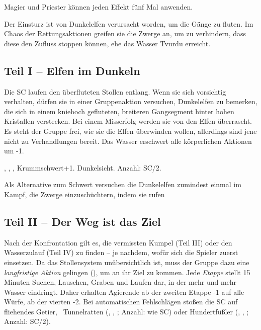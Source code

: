 {		

		\noindent
		Magier und Priester können jeden Effekt fünf Mal anwenden.


		\noindent
		Der Einsturz ist von Dunkelelfen verursacht worden, um die Gänge zu fluten. Im Chaos der Rettungsaktionen greifen sie die Zwerge an, um zu verhindern, dass diese den Zufluss stoppen können, ehe das Wasser Tvurdu erreicht.

		\subsection{Teil I -- Elfen im Dunkeln}

		\noindent
		Die SC laufen den überfluteten Stollen entlang. Wenn sie sich vorsichtig verhalten, dürfen sie in einer Gruppenaktion versuchen, Dunkelelfen zu bemerken, die sich in einem kniehoch gefluteten, breiteren Gangsegment hinter hohen Kristallen verstecken. Bei einem Misserfolg werden sie von den Elfen überrascht. Es steht der Gruppe frei, wie sie die Elfen überwinden wollen, allerdings sind jene nicht zu Verhandlungen bereit. Das Wasser erschwert alle körperlichen Aktionen um -1.

		 , , , Krummschwert+1. Dunkelsicht. Anzahl: SC/2.

		Als Alternative zum Schwert versuchen die Dunkelelfen zumindest einmal im Kampf, die Zwerge einzuschüchtern, indem sie rufen 

		\subsection{Teil II -- Der Weg ist das Ziel}

		Nach der Konfrontation gilt es, die vermissten Kumpel (Teil III) oder den Wasserzulauf (Teil IV) zu finden -- je nachdem, wofür sich die Spieler zuerst einsetzen. Da das Stollensystem unübersichtlich ist, muss der Gruppe dazu eine \emph{langfristige Aktion} gelingen (), um an ihr Ziel zu kommen. Jede \emph{Etappe} stellt 15 Minuten Suchen, Lauschen, Graben und Laufen dar, in der mehr und mehr Wasser eindringt. Daher erhalten Agierende ab der zweiten Etappe -1 auf alle Würfe, ab der vierten -2. Bei automatischen Fehlschlägen stoßen die SC auf fliehendes Getier, \zB\ Tunnelratten (, , ; Anzahl: wie SC) oder Hundertfüßler (, , ; Anzahl: SC/2).

}
